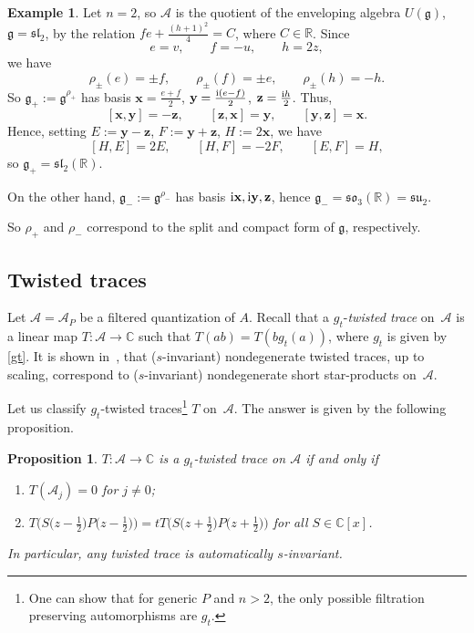 \documentclass[pdftex]{sigma}
\newcommand{\CN}{\mathbb{C}} %
\newcommand{\mc}[1]{\mathcal{#1}}
\newcommand{\g}{\mathfrak{g}}
\newtheorem{Proposition}[Theorem]{Proposition}
\theoremstyle{definition}
\newtheorem{Example}[Theorem]{Example}
\numberwithin{equation}{section}
\begin{document}
\begin{Example} Let $n=2$, so $\mc A$ is the quotient
of the enveloping algebra $U(\g)$, $\g=\mathfrak{sl}_2$, by the relation $fe+\frac{(h+1)^2}{4}=C$, where
$C\in \mathbb R$. Since
\[
e=v,\qquad f=-u,\qquad h=2z,
\]
we have
\[
\rho_\pm(e)=\pm f,\qquad \rho_\pm(f)=\pm e,\qquad \rho_\pm(h)=-h.
\]
So $\g_+:=\g^{\rho_+}$ has basis
$\mathbf{x}=\frac{e+f}{2}$, $\mathbf{y}=\frac{{\rm i}(e-f)}{2}$, $\mathbf{z}=\frac{{\rm i}h}{2}$.
Thus,
\[
[\mathbf{x},\mathbf{y}]=-\mathbf{z},\qquad [\mathbf{z},\mathbf{x}]=\mathbf{y},\qquad [\mathbf{y},\mathbf{z}]=\mathbf{x}.
\]
Hence, setting $E:=\mathbf{y}-\mathbf{z}$, $F:=\mathbf{y}+\mathbf{z}$, $H:=2\mathbf{x}$,
we have
\[
[H,E]=2E,\qquad [H,F]=-2F,\qquad [E,F]=H,
\]
so $\g_+=\mathfrak{sl}_2(\mathbb R)$.

On the other hand, $\g_-:=\g^{\rho_-}$ has basis
${\rm i}\mathbf{x},{\rm i}\mathbf{y},\mathbf{z}$, hence $\g_-=\mathfrak{so}_3(\mathbb R)=\mathfrak{su}_2$.

So $\rho_+$ and $\rho_-$ correspond to the split and compact form of $\g$, respectively.
\end{Example}

\subsection{Twisted traces}
Let $\mc A=\mc A_P$ be a filtered quantization of $A$. Recall \cite[Section~3.1]{ES} that a $g_t$-{\it twisted trace} on~$\mc A$ is a linear map $T\colon \mc{A}\to \CN$ such that $T(ab)=T(bg_t(a))$, where $g_t$ is given by \eqref{gt}. It is shown in~\cite[Section~3]{ES}, that ($s$-invariant) nondegenerate twisted traces, up to scaling, correspond to ($s$-invariant) nondegenerate short star-products on~$\mc A$.

Let us classify $g_t$-twisted traces\footnote{One can show that for generic $P$ and $n>2$, the only possible filtration preserving automorphisms are $g_t$.} $T$ on~$\mc A$. The answer is given by the following proposition.

\begin{Proposition}
$T\colon\mc{A}\to \CN$ is a $g_t$-twisted trace on $\mc{A}$ if and only if
\begin{enumerate}\itemsep=0pt
\item[$(1)$]
$T(\mc{A}_j)=0$ for $j\ne 0$;
\item[$(2)$]
$T\big(S\big(z-\tfrac{1}{2}\big)P\big(z-\tfrac{1}{2}\big)\big)
=tT\big( S\big(z+\tfrac{1}{2}\big)P\big(z+\tfrac{1}{2}\big)\big)$ for all $S \in\CN[x]$.
\end{enumerate}
In particular, any twisted trace is automatically $s$-invariant.
\end{Proposition}
\end{document}
